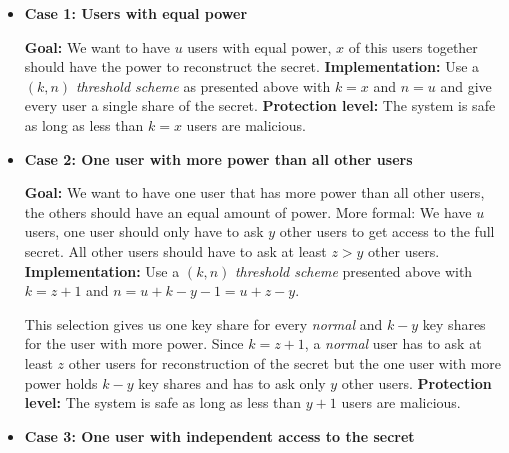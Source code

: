 \documentclass[runningheads]{llncs}
\begin{document}
\begin{itemize}
    \setlength\itemsep{1mm}
    \item \textbf{Case 1: Users with equal power} \newline
    
    \textbf{Goal:} We want to have $u$ users with equal power, $x$ of this users together should have the power to reconstruct the secret. \newline
    \textbf{Implementation:} Use a $(k,n)$ \textit{threshold scheme} as presented above with $k = x$ and $n = u$ and give every user a single share of the secret.\newline
    \textbf{Protection level:} The system is safe as long as less than $k = x$ users are malicious.
    \newline
    
    \item \textbf{Case 2: One user with more power than all other users} \newline
    
    \textbf{Goal:} We want to have one user that has more power than all other users, the others should have an equal amount of power. More formal: We have $u$ users, one user should only have to ask $y$ other users to get access to the full secret. All other users should have to ask at least $z>y$ other users. \newline
    \textbf{Implementation:} Use a $(k,n)$ \textit{threshold scheme} presented above with $k = z+1$ and $n = u + k - y - 1 = u + z - y$.
    
    This selection gives us one key share for every \textit{normal} and $k - y$ key shares for the user with more power. Since $k = z+1$, a \textit{normal} user has to ask at least $z$ other users for reconstruction of the secret but the one user with more power holds $k - y$ key shares and has to ask only $y$ other users. \newline
    \textbf{Protection level:} The system is safe as long as less than $y+1$ users are malicious.\newline
    
    \item \textbf{Case 3: One user with independent access to the secret} \newline
     

\end{itemize}
\end{document}
